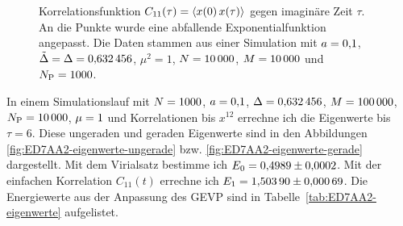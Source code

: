 \begin{figure}[htbp]
    \centering
    \caption{%
        Korrelationsfunktion $C_{11}(\tau) = \langle x(0) \, x(\tau) \rangle$ gegen
        imaginäre Zeit $\tau$. An die Punkte wurde eine abfallende
        Exponentialfunktion angepasst. Die Daten stammen aus einer Simulation
        mit $a = \num{0.1}$, $\tilde \Delta = \Delta =
        \num{0.632456}$, $\mu^2 = \num{1}$, $N = \num{10000}$,
        $M = \num{10000}$ und $N_\text P = \num{1000}$.
    }
    \label{fig:84DAA2-correlation}
\end{figure}

In einem Simulationslauf mit $N = \num{1000}$, $a =
\num{0.1}$, $\Delta = \num{0.632456}$, $M = \num{100000}$,
$N_\text P = \num{10000}$, $\mu = \num{1}$ und Korrelationen bis
$x^{12}$ errechne ich die Eigenwerte bis $\tau = \num{6}$. Diese ungeraden
und geraden Eigenwerte sind in den Abbildungen
\ref{fig:ED7AA2-eigenwerte-ungerade} bzw. \ref{fig:ED7AA2-eigenwerte-gerade}
dargestellt. Mit dem Virialsatz bestimme ich $E_0 = \num{0.4989 +- 0.0002}$.
Mit der einfachen Korrelation $C_{11}(t)$ errechne ich $E_1 = \num{1.50390 +-
0.00069}$. Die Energiewerte aus der Anpassung des GEVP sind in
Tabelle~\ref{tab:ED7AA2-eigenwerte} aufgelistet.

